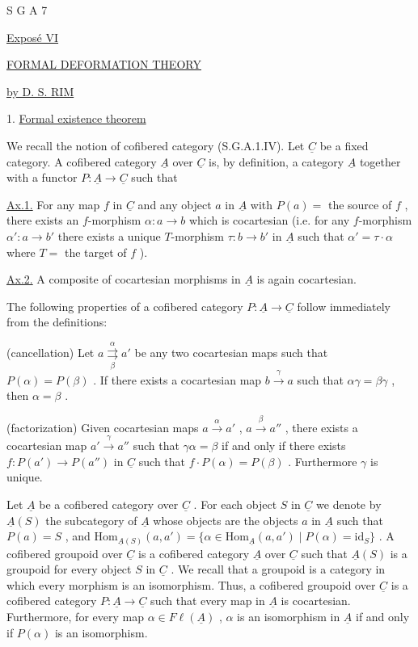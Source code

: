 


S G A  7


\underline{Exposé VI}


\underline{\underline{FORMAL DEFORMATION THEORY}}


\underline{by  D. S. RIM}


1. \underline{Formal existence theorem}

We recall the notion of cofibered category (S.G.A.1.IV). Let  $\underline{C}$  be a fixed category. A cofibered category  $\underline{A}$  over  $\underline{C}$  is, by definition, a category  $\underline{A}$  together with a functor  $P : \underline{A} \to \underline{C}$  such that

\underline{Ax.1.}  For any map  $f$  in  $\underline{C}$  and any object  $a$  in  $\underline{A}$  with  $P(a) =$ the source of  $f$  , there exists an  $f$-morphism  $\alpha : a \to b$  which is cocartesian (i.e. for any  $f$-morphism  $\alpha' : a \to b'$  there exists a unique  $T$-morphism  $\tau : b \to b'$  in  $\underline{A}$  such that  $\alpha' = \tau\cdot\alpha$  where  $T =$ the target of  $f$ ).

\underline{Ax.2.}  A composite of cocartesian morphisms in  $\underline{A}$  is again cocartesian.

The following properties of a cofibered category  $P : \underline{A} \to \underline{C}$  follow immediately from the definitions:

(cancellation)  Let  $a \overset{\alpha}{\underset{\beta}{\rightrightarrows}} a'$  be any two cocartesian maps such that  $P(\alpha) = P(\beta)$  . If there exists a cocartesian map  $b \overset{\gamma}{\to} a$  such that  $\alpha\gamma = \beta\gamma$ , then  $\alpha = \beta$  .

(factorization)  Given cocartesian maps  $a \overset{\alpha}{\to} a'$  ,  $a \overset{\beta}{\to} a''$  , there exists a cocartesian map  $a' \overset{\gamma}{\to} a''$  such that  $\gamma\alpha = \beta$  if and only if there exists  $f : P(a') \to P(a'')$  in  $\underline{C}$  such that  $f\cdot P(\alpha) = P(\beta)$  . Furthermore  $\gamma$  is unique.

Let  $\underline{A}$  be a cofibered category over  $\underline{C}$  . For each object  $S$  in  $\underline{C}$  we denote by  $\underline{A}(S)$  the subcategory of  $\underline{A}$  whose objects are the objects  $a$  in  $\underline{A}$  such that  $P(a) = S$  , and  $\mathrm{Hom}_{\underline{A}(S)}(a,a') = \{\alpha \in \mathrm{Hom}_{\underline{A}}(a,a') \mid P(\alpha) = \mathrm{id}_S\}$  . A cofibered groupoid over  $\underline{C}$  is a cofibered category  $\underline{A}$  over  $\underline{C}$  such that  $\underline{A}(S)$
is a groupoid for every object  $S$  in  $\underline{C}$ . We recall that a groupoid is a category in which every morphism is an isomorphism.  Thus, a cofibered groupoid over $\underline{C}$  is a cofibered category  $P : \underline{A} \to \underline{C}$  such that every map in  $\underline{A}$  is cocartesian. Furthermore, for every map  $\alpha \in F\ell(\underline{A})$  ,  $\alpha$  is an isomorphism in  $\underline{A}$  if and only if  $P(\alpha)$  is an isomorphism.

